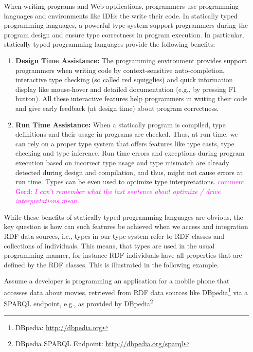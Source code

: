 \documentclass{llncs} %
\newcommand{\ggr}[1]{\textcolor{magenta}{comment Gerd: \textit{#1}}}
\begin{document}
When writing programs and Web applications, programmers use programming languages and environments like IDEs
the write their code. 
In statically typed programming languages, a powerful type system support programmers during the program design and 
ensure type correctness in program execution. In particular, statically typed programming languages provide the following benefits:

\begin{enumerate}
	\item \textbf{Design Time Assistance:} The programming environment provides support programmers when writing code by
	 context-sensitive auto-completion, interactive type checking (so called red squigglies) and quick information display like mouse-hover
	and detailed documentation (e.g., by pressing F1 button). All these interactive features help programmers in writing their code
	and give early feedback (at design time) about program correctness. 
	\item \textbf{Run Time Assistance:} When a statically program is compiled, type definitions and their usage in programs
	        are checked. Thus, at run time, we can rely on a proper type system that offers features like type casts,
					 type checking and type inference. Run time errors and exceptions during program execution based on
					 incorrect type usage and type mismatch are already detected during design and compilation, and thus, might not
					cause errors at run time. Types can be even used to optimize type interpretations.
					\ggr{I can't remember what the last sentence about optimize / drive interpretations mean.}
					
\end{enumerate}

While these benefits of statically typed programming languages are obvious,
the key question is how can such features be achieved when we access and integration RDF data sources,
i.e., types in our type system refer to RDF classes and collections of individuals.
This means, that types are used in the usual programming manner, for instance RDF individuals
have all properties that are defined by the RDF classes. This is illustrated in the following example.

Assume a developer is programming an application for a mobile phone that accesses data about movies, retrieved
from RDF data sources like DBpedia\footnote{DBpedia: \url{http://dbpedia.org}} via a SPARQL endpoint,
e.g., as provided by DBpedia\footnote{DBpedia SPARQL Endpoint: \url{http://dbpedia.org/sparql}}.
\end{document}
